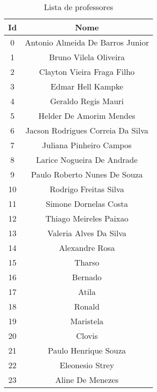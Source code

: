 \begin{apendices}
\begin{table}[H]
\footnotesize
\centering
\begin{tabular}{|c|c|}
\hline
\textbf{Id} & \textbf{Nome} \\ \hline
0 & Antonio Almeida De Barros Junior \\ \hline
1 & Bruno Vilela Oliveira \\ \hline
2 & Clayton Vieira Fraga Filho \\ \hline
3 & Edmar Hell Kampke \\ \hline
4 & Geraldo Regis Mauri \\ \hline
5 & Helder De Amorim Mendes \\ \hline
6 & Jacson Rodrigues Correia Da Silva \\ \hline
7 & Juliana Pinheiro Campos \\ \hline
8 & Larice Nogueira De Andrade \\ \hline
9 & Paulo Roberto Nunes De Souza \\ \hline
10 & Rodrigo Freitas Silva \\ \hline
11 & Simone Dornelas Costa \\ \hline
12 & Thiago Meireles Paixao \\ \hline
13 & Valeria Alves Da Silva \\ \hline
14 & Alexandre Rosa \\ \hline
15 & Tharso \\ \hline
16 & Bernado \\ \hline
17 & Atila \\ \hline
18 & Ronald \\ \hline
19 & Maristela \\ \hline
20 & Clovis \\ \hline
21 & Paulo Henrique Souza \\ \hline
22 & Eleonesio Strey \\ \hline
23 & Aline De Menezes \\ \hline
\end{tabular}
\caption{Lista de professores}
\label{ap-lista-prof-2013}
\end{table}


\end{apendices}
